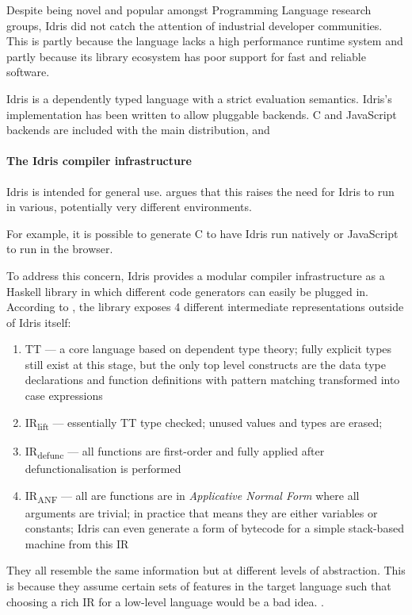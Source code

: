 \documentclass[a4paper,11pt,twocolumn]{article}
\begin{document}
Despite being novel and popular amongst Programming Language research
groups, Idris did not catch the attention of industrial developer
communities.
This is partly because the language lacks a high performance
runtime system and partly because its library ecosystem has poor
support for fast and reliable software.

Idris \cite{idris} is a dependently typed language with a strict
evaluation semantics. Idris's implementation has been written to allow
pluggable backends. C and JavaScript backends are included with the
main distribution, and

\paragraph{The Idris compiler infrastructure}


Idris is intended for general use. \cite{crosscompilers} argues
that this raises the need for Idris to run in various, potentially
very different environments.

For example, it is possible to generate C to have Idris run
natively or JavaScript to run in the browser.

To address this concern, Idris provides a modular compiler
infrastructure as a Haskell library in which different code
generators can easily be plugged in.
According to \cite{crosscompilers},
the library exposes 4 different intermediate representations outside
of Idris itself:
\begin{enumerate}
    \item TT --- a core language based on dependent type theory; fully
          explicit types still exist at this stage, but the only top level
          constructs are the data type declarations and function definitions
          with pattern matching transformed into case expressions
    \item IR\textsubscript{lift} --- essentially TT type checked; unused values
          and types are erased;
    \item IR\textsubscript{defunc} --- all functions are first-order
          and fully applied after defunctionalisation is performed
    \item IR\textsubscript{ANF} --- all are functions are in
          \emph{Applicative Normal Form} where all arguments are trivial;
          in practice that means they are either variables or constants;
          Idris can even generate a form of bytecode for a simple
          stack-based machine from this IR
\end{enumerate}
They all resemble the same information but at different levels
of abstraction. This is because they assume certain sets of features
in the target language such that choosing a rich IR
for a low-level language would be a bad idea.
\cite{ElliottIdrisErlang}.
\end{document}
